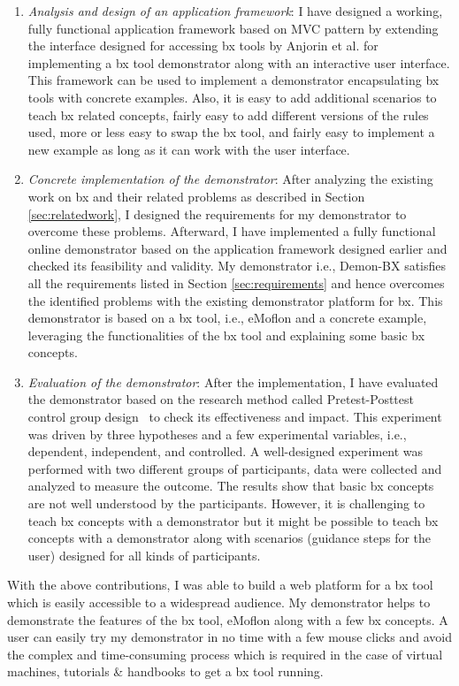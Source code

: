 \begin{enumerate}
	\item {\textit{Analysis and design of an application framework}: I have designed a working, fully functional application framework based on MVC pattern by extending the interface designed for accessing bx tools by Anjorin et al. \cite{benchmarx-reload} for implementing a bx tool demonstrator along with an interactive user interface. This framework can be used to implement a demonstrator encapsulating bx tools with concrete examples. Also, it is easy to add additional scenarios to teach bx related concepts, fairly easy to add different versions of the rules used, more or less easy to swap the bx tool, and fairly easy to implement a new example as long as it can work with the user interface.}
    \item {\textit{Concrete implementation of the demonstrator}: After analyzing the existing work on bx and their related problems as described in Section \ref{sec:relatedwork}, I designed the requirements for my demonstrator to overcome these problems. Afterward, I have implemented a fully functional online demonstrator based on the application framework designed earlier and checked its feasibility and validity. My demonstrator i.e., Demon-BX satisfies all the requirements listed in Section \ref{sec:requirements} and hence overcomes the identified problems with the existing demonstrator platform for bx. This demonstrator is based on a bx tool, i.e., eMoflon and a concrete example, leveraging the functionalities of the bx tool and explaining some basic bx concepts.}
    \item {\textit{Evaluation of the demonstrator}: After the implementation, I have evaluated the demonstrator based on the research method called Pretest-Posttest control group design~\cite{expandquasiexpdesign} to check its effectiveness and impact. This experiment was driven by three hypotheses and a few experimental variables, i.e., dependent, independent, and controlled. A well-designed experiment was performed with two different groups of participants, data were collected and analyzed to measure the outcome. The results show that basic bx concepts are not well understood by the participants. However, it is challenging to teach bx concepts with a demonstrator but it might be possible to teach bx concepts with a demonstrator along with scenarios (guidance steps for the user) designed for all kinds of participants.}	
\end{enumerate}

With the above contributions, I was able to build a web platform for a bx tool which is easily accessible to a widespread audience. My demonstrator helps to demonstrate the features of the bx tool, eMoflon along with a few bx concepts. A user can easily try my demonstrator in no time with a few mouse clicks and avoid the complex and time-consuming process which is required in the case of virtual machines, tutorials \& handbooks to get a bx tool running. 


